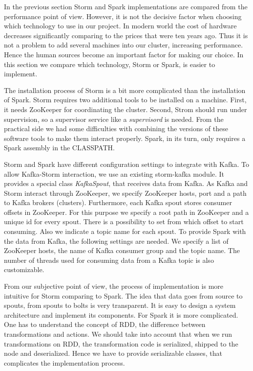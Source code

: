 In the previous section Storm and Spark implementations are compared from the performance point of view.
However, it is not the decisive factor when choosing which technology to use in our project.
In modern world the cost of hardware decreases significantly comparing to the prices that were ten years ago.
Thus it is not a problem to add several machines into our cluster, increasing performance.
Hence the human sources become an important factor for making our choice.
In this section we compare which technology, Storm or Spark, is easier to implement.

The installation process of Storm is a bit more complicated than the installation of Spark.
Storm requires two additional tools to be installed on a machine.
First, it needs ZooKeeper for coordinating the cluster.
Second, Strom should run under supervision, so a supervisor service like a \textit{supervisord} is needed.
From the practical side we had some difficulties with combining the versions of these software tools to make them interact properly.
Spark, in its turn, only requires a Spark assembly in the CLASSPATH.

Storm and Spark have different configuration settings to integrate with Kafka.
To allow Kafka-Storm interaction, we use an existing storm-kafka module.
It provides a special class \textit{KafkaSpout}, that receives data from Kafka.
As Kafka and Storm interact through ZooKeeper, we specify ZooKeeper hosts, port and a path to Kafka brokers (clusters).
Furthermore, each Kafka spout stores consumer offsets in ZooKeeper.
For this purpose we specify a root path in ZooKeeper and a unique id for every spout.
There is a possibility to set from which offset to start consuming.
Also we indicate a topic name for each spout.
To provide Spark with the data from Kafka, the following settings are needed.
We specify a list of ZooKeeper hosts, the name of Kafka consumer group and the topic name.
The number of threads used for consuming data from a Kafka topic is also customizable.

From our subjective point of view, the process of implementation is more intuitive for Storm comparing to Spark.
The idea that data goes from source to spouts, from spouts to bolts is very transparent.
It is easy to design a system architecture and implement its components.
For Spark it is more complicated.
One has to understand the concept of RDD, the difference between transformations and actions.
We should take into account that when we run transformations on RDD, the transformation code is serialized, shipped to the node and deserialized.
Hence we have to provide serializable classes, that complicates the implementation process.

